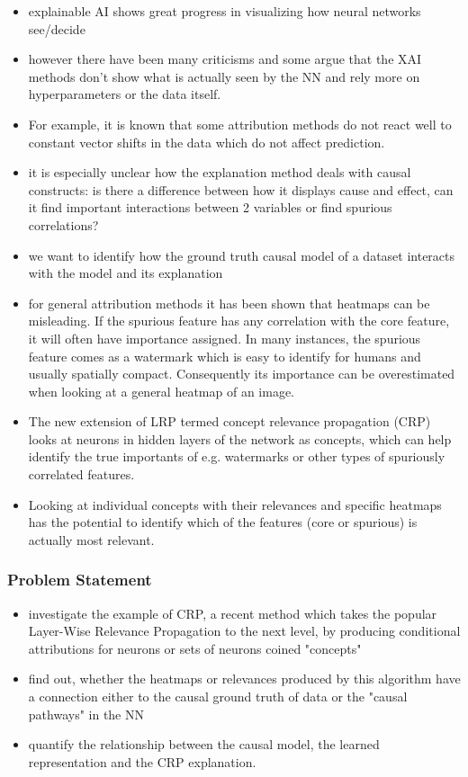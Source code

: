 \begin{itemize}
    \item explainable AI shows great progress in visualizing how neural networks see/decide
    \item however there have been many criticisms and some argue that the XAI methods don't show what is actually seen by the NN and rely more on hyperparameters or the data itself.
    \item For example, it is known that some attribution methods do not react well to constant vector shifts in the data which do not affect prediction.
    \item it is especially unclear how the explanation method deals with causal constructs: is there a difference between how it displays cause and effect, can it find important interactions between 2 variables or find spurious correlations?
    \item we want to identify how the ground truth causal model of a dataset interacts with the model and its explanation
    \item for general attribution methods it has been shown that heatmaps can be misleading. If the spurious feature has any correlation with the core feature, it will often have importance assigned. In many instances, the spurious feature comes as a watermark which is easy to identify for humans and usually spatially compact. Consequently its importance can be overestimated when looking at a general heatmap of an image.
    \item The new extension of LRP termed concept relevance propagation (CRP) looks at neurons in hidden layers of the network as concepts, which can help identify the true importants of e.g. watermarks or other types of spuriously correlated features. 
    \item Looking at individual concepts with their relevances and specific heatmaps has the potential to identify which of the features (core or spurious) is actually most relevant.
\end{itemize}


\subsubsection*{Problem Statement}
\begin{itemize}
    \item investigate the example of CRP, a recent method which takes the popular Layer-Wise Relevance Propagation to the next level, by producing conditional attributions for neurons or sets of neurons coined "concepts"
    \item find out, whether the heatmaps or relevances produced by this algorithm have a connection either to the causal ground truth of data or the "causal pathways" in the NN
    \item quantify the relationship between the causal model, the learned representation and the CRP explanation.
\end{itemize}

